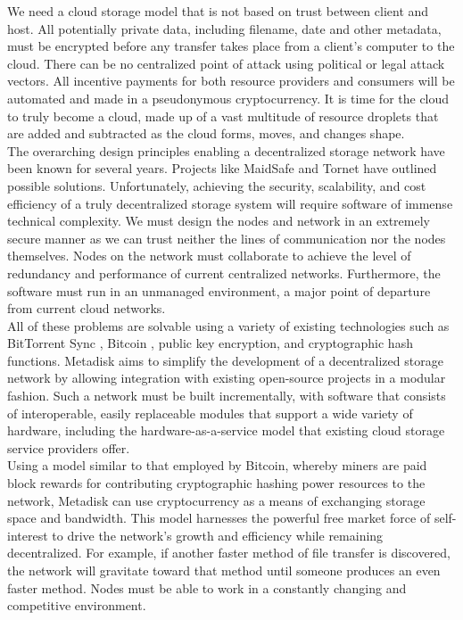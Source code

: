 \documentclass[a4paper,10pt]{article}
\begin{document}
We need a cloud storage model that is not based on trust between client and host.  All potentially private data, including filename, date and other metadata, must be encrypted before any transfer takes place from a client’s computer to the cloud.  There can be no centralized point of attack using political or legal attack vectors.  All incentive payments for both resource providers and consumers will be automated and made in a pseudonymous cryptocurrency.  It is time for the cloud to truly become a cloud, made up of a vast multitude of resource droplets that are added and subtracted as the cloud forms, moves, and changes shape.\\

The overarching design principles enabling a decentralized storage network have been known for several years. Projects like MaidSafe \cite{1} and Tornet \cite{2} have outlined possible solutions. Unfortunately, achieving the security, scalability, and cost efficiency of a truly decentralized storage system will require software of immense technical complexity. We must design the nodes and network in an extremely secure manner as we can trust neither the lines of communication nor the nodes themselves. Nodes on the network must collaborate to achieve the level of redundancy and performance of current centralized networks. Furthermore, the software must run in an unmanaged environment, a major point of departure from current cloud networks.   \\

All of these problems are solvable using a variety of existing technologies such as BitTorrent Sync \cite{3}, Bitcoin \cite{4}, public key encryption, and cryptographic hash functions.  Metadisk aims to simplify the development of a decentralized storage network by allowing integration with existing open-source projects in a modular fashion.  Such a network must be built incrementally, with software that consists of interoperable, easily replaceable modules that support a wide variety of hardware, including the hardware-as-a-service model that existing cloud storage service providers offer. \\

Using a model similar to that employed by Bitcoin, whereby miners are paid block rewards for contributing cryptographic hashing power resources to the network, Metadisk can use  cryptocurrency as a means of exchanging storage space and bandwidth. This model harnesses the powerful free market force of self-interest to drive the network’s growth and efficiency while remaining decentralized.  For example, if another faster method of file transfer is discovered, the network will gravitate toward that method until someone produces an even faster method. Nodes must be able to work in a constantly changing and competitive environment.  
\end{document}
